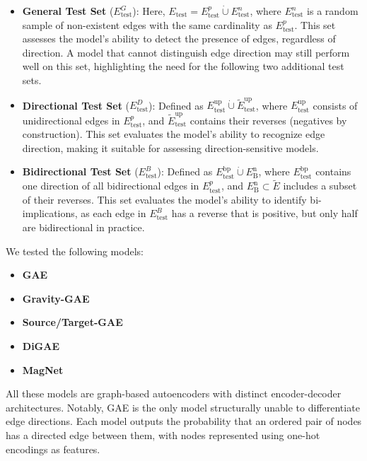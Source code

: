 \begin{itemize}
    \item \textbf{General Test Set} ($E_{\text{test}}^G$):
    Here, $E_{\text{test}} = E_{\text{test}}^p \dot{\cup} E_{\text{test}}^n$, where $E_{\text{test}}^n$
    is a random sample of non-existent edges with the same cardinality as $E_{\text{test}}^p$.
    This set assesses the model's ability to detect the presence of edges, regardless of direction.
    A model that cannot distinguish edge direction may still perform well on this set, highlighting
    the need for the following two additional test sets.
    \item \textbf{Directional Test Set} ($E_{\text{test}}^D$):
    Defined as $E_{\text{test}}^{\text{up}} \dot{\cup} \tilde{E}_{\text{test}}^{\text{up}}$,
    where $E_{\text{test}}^{\text{up}}$ consists of unidirectional edges in $E_{\text{test}}^p$,
    and $\tilde{E}_{\text{test}}^{\text{up}}$ contains their reverses (negatives by construction).
    This set evaluates the model's ability to recognize edge direction, making it suitable for
    assessing direction-sensitive models.
    \item \textbf{Bidirectional Test Set} ($E_{\text{test}}^B$):
    Defined as $E_{\text{test}}^{\text{bp}} \dot{\cup} E_{\text{B}}^{\text{n}}$,
    where $E_{\text{test}}^{\text{bp}}$ contains one direction of all bidirectional edges in $E_{\text{test}}^p$,
    and $E_{\text{B}}^{\text{n}} \subset \tilde{E}$ includes a subset of their reverses.
    This set evaluates the model's ability to identify bi-implications, as each edge in $E_{\text{test}}^B$
    has a reverse that is positive, but only half are bidirectional in practice.
\end{itemize}

We tested the following models:

\begin{itemize}
    \item \textbf{GAE}~\cite{Kipf2016}
    \item \textbf{Gravity-GAE}~\cite{Salha2019}
    \item \textbf{Source/Target-GAE}~\cite{Salha2019}
    \item \textbf{DiGAE}~\cite{Kollias2022}
    \item \textbf{MagNet}~\cite{Zhang2021}
\end{itemize}

All these models are graph-based autoencoders with distinct encoder-decoder architectures.
Notably, GAE is the only model structurally unable to differentiate edge directions.
Each model outputs the probability that an ordered pair of nodes has a directed edge between them,
with nodes represented using one-hot encodings as features.

